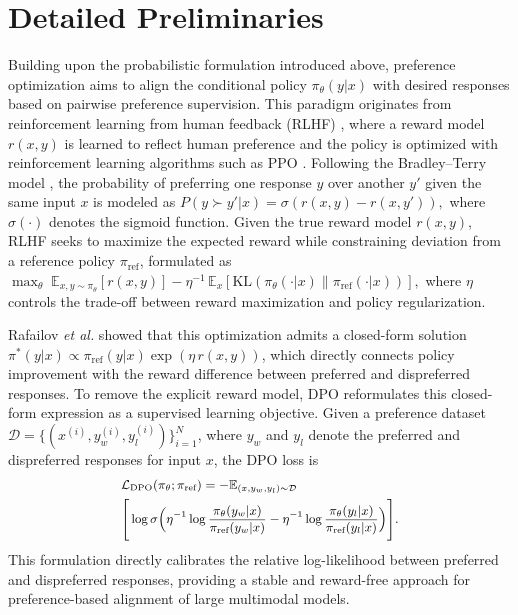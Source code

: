 \clearpage
\setcounter{page}{1}
\maketitlesupplementary

\renewcommand{\thesection}{S\arabic{section}}
\renewcommand{\thesubsection}{S\arabic{section}.\arabic{subsection}}
\setcounter{section}{0}



\section{Detailed Preliminaries}
\label{supp:pref_optim}

Building upon the probabilistic formulation introduced above, preference optimization aims to align the conditional policy $\pi_{\theta}(y|x)$ with desired responses based on pairwise preference supervision. 
This paradigm originates from reinforcement learning from human feedback (RLHF) \cite{Christiano2017RLHF}, 
where a reward model $r(x,y)$ is learned to reflect human preference and the policy is optimized with reinforcement learning algorithms such as PPO \cite{Schulman2017PPO}. 
Following the Bradley--Terry model \cite{Bradley1952BT}, the probability of preferring one response $y$ over another $y'$ given the same input $x$ is modeled as
$
P(y \succ y'|x) = \sigma(r(x,y) - r(x,y')) ,
$
where $\sigma(\cdot)$ denotes the sigmoid function. 
Given the true reward model $r(x,y)$, RLHF seeks to maximize the expected reward while constraining deviation from a reference policy $\pi_{\text{ref}}$, formulated as $
\max_{\theta} \; \mathbb{E}_{x,y\sim\pi_\theta} [r(x,y)] - \eta^{-1} \, \mathbb{E}_{x} [\mathrm{KL}(\pi_\theta(\cdot|x) \| \pi_{\text{ref}}(\cdot|x))],
$
where $\eta$ controls the trade-off between reward maximization and policy regularization. 


Rafailov \textit{et al.} \cite{rafailov2023direct} showed that this optimization admits a closed-form solution $
\pi^{*}(y|x) \propto \pi_{\text{ref}}(y|x)\exp(\eta\, r(x,y))$,
which directly connects policy improvement with the reward difference between preferred and dispreferred responses. To remove the explicit reward model, DPO reformulates this closed-form expression as a supervised learning objective. 
Given a preference dataset $\mathcal{D}=\{(x^{(i)},y_w^{(i)},y_l^{(i)})\}_{i=1}^{N}$, where $y_w$ and $y_l$ denote the preferred and dispreferred responses for input $x$, the DPO loss is
\begin{equation}
\small
\begin{aligned}
&\mathcal{L}_{\text{DPO}}(\pi_\theta; \pi_{\text{ref}}) 
= -\mathbb{E}_{(x,y_w,y_l)\sim\mathcal{D}} \\&\Bigg[
\log \sigma \Big(
\eta^{-1} \log \frac{\pi_\theta(y_w|x)}{\pi_{\text{ref}}(y_w|x)}
- \eta^{-1} \log \frac{\pi_\theta(y_l|x)}{\pi_{\text{ref}}(y_l|x)}
\Big) \Bigg].
\end{aligned}
\label{eq:dpo_loss}
\end{equation}
This formulation directly calibrates the relative log-likelihood between preferred and dispreferred responses, providing a stable and reward-free approach for preference-based alignment of large multimodal models.

